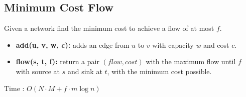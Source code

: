 \subsection{Minimum Cost Flow}

Given a network find the minimum cost to achieve a flow of at most $f$.


\begin{itemize}
  \item \textbf{add(u, v, w, c):} adds an edge from $u$ to $v$ with capacity $w$ and cost $c$.
  \item \textbf{flow(s, t, f):} return a pair $(flow, cost)$ with the maximum flow until $f$ with source at $s$ and sink at $t$, with the minimum cost possible.
\end{itemize}

Time : $O(N \cdot M + f \cdot m \log{n})$

